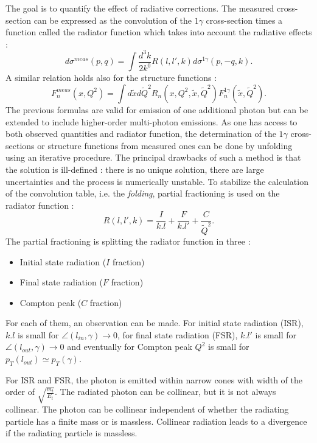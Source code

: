 The goal is to quantify the effect of radiative corrections. The measured cross-section can be expressed as the convolution of the $1\gamma$ cross-section times a function called the radiator function which takes into account the radiative effects \cite{DjangohSeminar} :
%
\begin{equation}
  d\sigma^{meas}(p,q) = \int \frac{d^{3}k}{2k^{0}}R(l,l',k)d\sigma^{1\gamma}(p,-q,k).
\end{equation}
%
A similar relation holds also for the structure functions :
%
\begin{equation}
  F_{n}^{meas}(x,Q^{2}) = \int d\tilde{x}d\tilde{Q}^{2}R_{n}(x,Q^{2},\tilde{x},\tilde{Q}^{2})F_{n}^{1\gamma}(\tilde{x},\tilde{Q}^{2}).
\end{equation}
%
The previous formulas are valid for emission of one additional photon but can be extended to include higher-order multi-photon emissions. As one has access to both observed quantities and radiator function, the determination of the $1\gamma$ cross-sections or structure functions from measured ones can be done by unfolding using an iterative procedure. The principal drawbacks of such a method is that the solution is ill-defined : there is no unique solution, there are large uncertainties and the process is numerically unstable. To stabilize the calculation of the convolution table, i.e. the \textit{folding}, partial fractioning is used on the radiator function :
%
\begin{equation}
  R(l,l',k) = \frac{I}{k.l}+\frac{F}{k.l'}+\frac{C}{\tilde{Q}^{2}}.
\end{equation}
%
The partial fractioning is splitting the radiator function in three :
\begin{itemize}
\item Initial state radiation ($I$ fraction)
\item Final state radiation ($F$ fraction)
\item Compton peak ($C$ fraction)
\end{itemize}

For each of them, an observation can be made. For initial state radiation (ISR), $k.l$ is small for
$\angle (l_{in},\gamma) \rightarrow 0$, for final state radiation (FSR), $k.l'$ is small for
$\angle (l_{out},\gamma) \rightarrow 0$ and eventually for Compton peak $Q^{2}$ is small for
$p_{T}(l_{out}) \simeq p_{T}(\gamma)$.

For ISR and FSR, the photon is emitted within narrow cones with width of the order of $\sqrt{\frac{m_{t}}{E_{t}}}$. The radiated photon can be collinear, but it is not always collinear.
The photon can be collinear independent of whether the radiating particle has a finite mass or is massless. Collinear radiation leads to a divergence if the radiating particle is massless.

